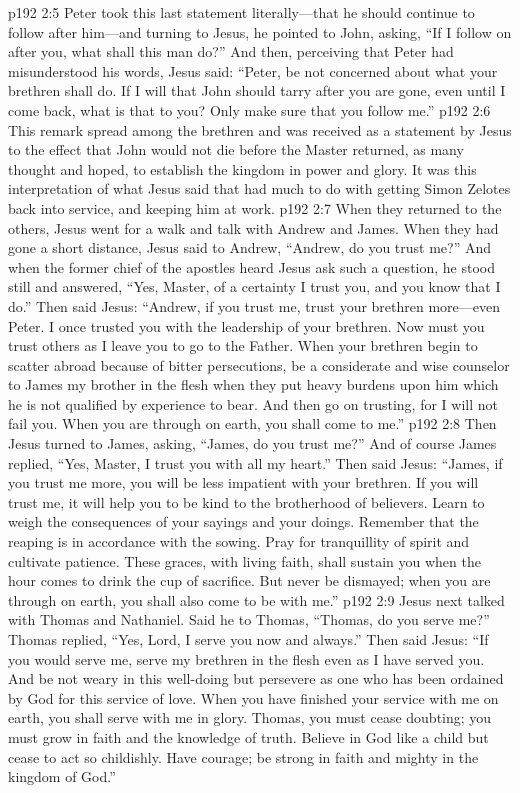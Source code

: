 \vs p192 2:5 Peter took this last statement literally---that he should continue to follow after him---and turning to Jesus, he pointed to John, asking, “If I follow on after you, what shall this man do?” And then, perceiving that Peter had misunderstood his words, Jesus said: \textcolor{ubdarkred}{“Peter, be not concerned about what your brethren shall do. If I will that John should tarry after you are gone, even until I come back, what is that to you? Only make sure that you follow me.”}
\pc \vs p192 2:6 This remark spread among the brethren and was received as a statement by Jesus to the effect that John would not die before the Master returned, as many thought and hoped, to establish the kingdom in power and glory. It was this interpretation of what Jesus said that had much to do with getting Simon Zelotes back into service, and keeping him at work.
\pc \vs p192 2:7 When they returned to the others, Jesus went for a walk and talk with Andrew and James. When they had gone a short distance, Jesus said to Andrew, \textcolor{ubdarkred}{“Andrew, do you trust me?”} And when the former chief of the apostles heard Jesus ask such a question, he stood still and answered, “Yes, Master, of a certainty I trust you, and you know that I do.” Then said Jesus: \textcolor{ubdarkred}{“Andrew, if you trust me, trust your brethren more---even Peter. I once trusted you with the leadership of your brethren. Now must you trust others as I leave you to go to the Father. When your brethren begin to scatter abroad because of bitter persecutions, be a considerate and wise counselor to James my brother in the flesh when they put heavy burdens upon him which he is not qualified by experience to bear. And then go on trusting, for I will not fail you. When you are through on earth, you shall come to me.”}
\vs p192 2:8 Then Jesus turned to James, asking, \textcolor{ubdarkred}{“James, do you trust me?”} And of course James replied, “Yes, Master, I trust you with all my heart.” Then said Jesus: \textcolor{ubdarkred}{“James, if you trust me more, you will be less impatient with your brethren. If you will trust me, it will help you to be kind to the brotherhood of believers. Learn to weigh the consequences of your sayings and your doings. Remember that the reaping is in accordance with the sowing. Pray for tranquillity of spirit and cultivate patience. These graces, with living faith, shall sustain you when the hour comes to drink the cup of sacrifice. But never be dismayed; when you are through on earth, you shall also come to be with me.”}
\pc \vs p192 2:9 Jesus next talked with Thomas and Nathaniel. Said he to Thomas, \textcolor{ubdarkred}{“Thomas, do you serve me?”} Thomas replied, “Yes, Lord, I serve you now and always.” Then said Jesus: \textcolor{ubdarkred}{“If you would serve me, serve my brethren in the flesh even as I have served you. And be not weary in this well\hyp{}doing but persevere as one who has been ordained by God for this service of love. When you have finished your service with me on earth, you shall serve with me in glory. Thomas, you must cease doubting; you must grow in faith and the knowledge of truth. Believe in God like a child but cease to act so childishly. Have courage; be strong in faith and mighty in the kingdom of God.”}
